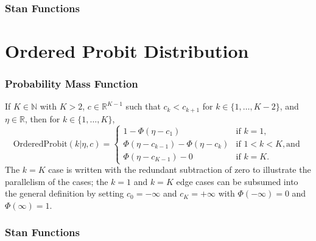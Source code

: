 \begin{description}


\subsubsection{Stan Functions}


\begin{description}   


 \end{description}


\section{Ordered Probit Distribution}


\subsubsection{Probability Mass Function}


If $K \in \mathbb{N}$ with $K > 2$, $c \in \mathbb{R}^{K-1}$ such that $c_k < c_{k+1}$ for $k \in \{1,\ldots,K-2\}$, and $\eta \in \mathbb{R}$, then for $k \in \{1,\ldots,K\}$, \[ \text{OrderedProbit}(k|\eta,c) = \left\{ \begin{array}{ll} 1 - \Phi(\eta - c_1) & \text{if } k = 1, \\[4pt] \Phi(\eta - c_{k-1}) - \Phi(\eta - c_{k})  & \text{if } 1 < k < K, \text{and} \\[4pt] \Phi(\eta - c_{K-1}) - 0 & \text{if } k = K. \end{array} \right. \] The $k=K$ case is written with the redundant subtraction of zero to illustrate the parallelism of the cases; the $k=1$ and $k=K$ edge cases can be subsumed into the general definition by setting $c_0 = -\infty$ and $c_K = +\infty$ with $\Phi(-\infty) = 0$ and $\Phi(\infty) = 1$.




\subsubsection{Stan Functions}



\end{description}
